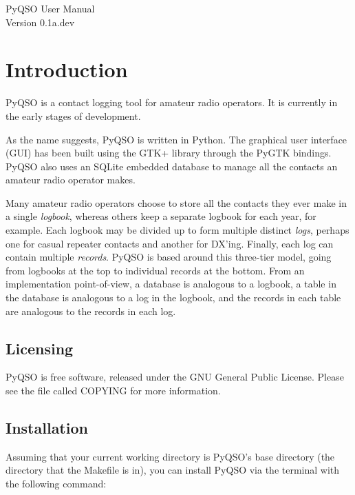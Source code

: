 \documentclass[11pt, a4paper]{report}
\begin{document}
\begin{titlepage}
\begin{center}
\vspace*{5cm}
\huge{PyQSO User Manual}\\\vspace*{5cm}
\LARGE{Version 0.1a.dev}
\end{center}
\end{titlepage}

\tableofcontents

\chapter{Introduction}
PyQSO is a contact logging tool for amateur radio operators. It is currently in the early stages of development.

As the name suggests, PyQSO is written in Python. The graphical user interface (GUI) has been built using the GTK+ library through the PyGTK bindings. PyQSO also uses an SQLite embedded database to manage all the contacts an amateur radio operator makes.

Many amateur radio operators choose to store all the contacts they ever make in a single \textit{logbook}, whereas others keep a separate logbook for each year, for example. Each logbook may be divided up to form multiple distinct \textit{logs}, perhaps one for casual repeater contacts and another for DX'ing. Finally, each log can contain multiple \textit{records}. PyQSO is based around this three-tier model, going from logbooks at the top to individual records at the bottom. From an implementation point-of-view, a database is analogous to a logbook, a table in the database is analogous to a log in the logbook, and the records in each table are analogous to the records in each log.

\section{Licensing}
PyQSO is free software, released under the GNU General Public License. Please see the file called COPYING for more information.

\section{Installation}
Assuming that your current working directory is PyQSO's base directory (the directory that the Makefile is in), you can install PyQSO via the terminal with the following command:
\end{document}
